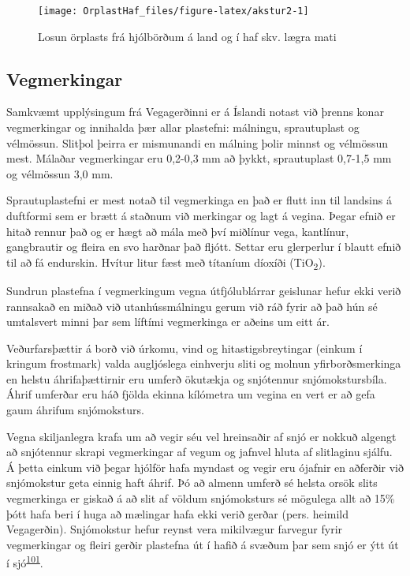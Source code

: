 \documentclass[icelandic,]{book}
\begin{document}
\begin{figure}

{\centering \texttt{[image: OrplastHaf\_files/figure-latex/akstur2-1]} 

}

\caption{Losun örplasts frá hjólbörðum á land og í haf skv. lægra mati}\label{fig:akstur2}
\end{figure}

\hypertarget{vegmerkingar}{%
\subsection*{Vegmerkingar}\label{vegmerkingar}}

Samkvæmt upplýsingum frá Vegagerðinni er á Íslandi notast við þrenns konar vegmerkingar og innihalda þær allar plastefni: málningu, sprautuplast og vélmössun. Slitþol þeirra er mismunandi en málning þolir minnst og vélmössun mest. Málaðar vegmerkingar eru 0,2-0,3 mm að þykkt, sprautuplast 0,7-1,5 mm og vélmössun 3,0 mm.

Sprautuplastefni er mest notað til vegmerkinga en það er flutt inn til landsins á duftformi sem er brætt á staðnum við merkingar og lagt á vegina. Þegar efnið er hitað rennur það og er hægt að mála með því miðlínur vega, kantlínur, gangbrautir og fleira en svo harðnar það fljótt. Settar eru glerperlur í blautt efnið til að fá endurskin. Hvítur litur fæst með títaníum díoxíði (TiO\textsubscript{2}).

Sundrun plastefna í vegmerkingum vegna útfjólublárrar geislunar hefur ekki verið rannsakað en miðað við utanhússmálningu gerum við ráð fyrir að það hún sé umtalsvert minni þar sem líftími vegmerkinga er aðeins um eitt ár.

Veðurfarsþættir á borð við úrkomu, vind og hitastigsbreytingar (einkum í kringum frostmark) valda augljóslega einhverju sliti og molnun yfirborðsmerkinga en helstu áhrifaþættirnir eru umferð ökutækja og snjótennur snjómokstursbíla. Áhrif umferðar eru háð fjölda ekinna kílómetra um vegina en vert er að gefa gaum áhrifum snjómoksturs.

Vegna skiljanlegra krafa um að vegir séu vel hreinsaðir af snjó er nokkuð algengt að snjótennur skrapi vegmerkingar af vegum og jafnvel hluta af slitlaginu sjálfu. Á þetta einkum við þegar hjólför hafa myndast og vegir eru ójafnir en aðferðir við snjómokstur geta einnig haft áhrif. Þó að almenn umferð sé helsta orsök slits vegmerkinga er giskað á að slit af völdum snjómoksturs sé mögulega allt að 15\% þótt hafa beri í huga að mælingar hafa ekki verið gerðar (pers. heimild Vegagerðin). Snjómokstur hefur reynst vera mikilvægur farvegur fyrir vegmerkingar og fleiri gerðir plastefna út í hafið á svæðum þar sem snjó er ýtt út í sjó\textsuperscript{\protect\hyperlink{ref-BaztanJ2018}{101}}.
\end{document}
